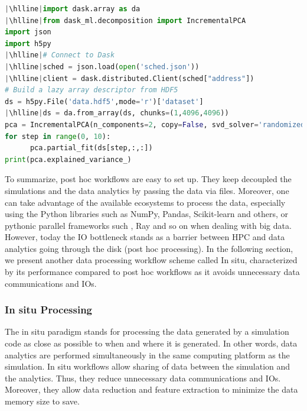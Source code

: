 \begin{lstlisting}[float, label=post, language=python, caption=Parallel post hoc data analysis with \dask. Lines differing from the analysis of Listing~\ref{numpy} are highlighted]
|\hlline|import dask.array as da
|\hlline|from dask_ml.decomposition import IncrementalPCA
import json
import h5py
|\hlline|# Connect to Dask
|\hlline|sched = json.load(open('sched.json'))
|\hlline|client = dask.distributed.Client(sched["address"])
# Build a lazy array descriptor from HDF5
ds = h5py.File('data.hdf5',mode='r')['dataset']
|\hlline|ds = da.from_array(ds, chunks=(1,4096,4096))
pca = IncrementalPCA(n_components=2, copy=False, svd_solver='randomized')
for step in range(0, 10):
      pca.partial_fit(ds[step,:,:])
print(pca.explained_variance_)
\end{lstlisting}


To summarize, post hoc workflows are easy to set up. They keep decoupled the simulations and the data analytics by passing the data via files. Moreover, one can take advantage of the available ecosystems to process the data, especially using the Python libraries such as NumPy, Pandas, Scikit-learn and others, or pythonic parallel frameworks such \dask, Ray and so on when dealing with big data. However, today the IO bottleneck stands as a barrier between HPC and data analytics going through the disk (post hoc processing). In the following section, we present another data processing workflow scheme called In situ, characterized by its performance compared to post hoc workflows as it avoids unnecessary data communications and IOs.      



\subsubsection{In situ Processing}\label{sec:insitu}

The in situ\cite{InSituLiuMa:2007, in_situ_methodes} paradigm stands for processing the data generated by a simulation code as close as possible to when and where it is generated. In other words, data analytics are performed simultaneously in the same computing platform as the simulation.
In situ workflows allow sharing of data between the simulation and the analytics. Thus, they reduce unnecessary data communications and IOs. Moreover, they allow data reduction and feature extraction to minimize the data memory size to save.   

